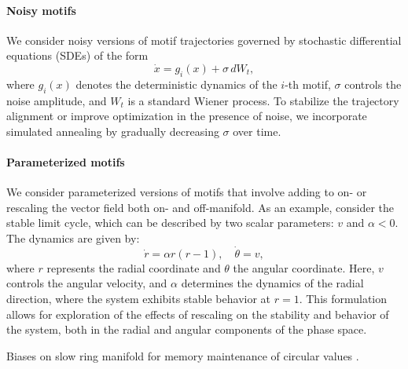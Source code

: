 \documentclass{article}
\theoremstyle{definition} \newtheorem{definition}{Definition}  \newtheorem{example}{Example}
\theoremstyle{remark} \newtheorem{remark}{Remark}
\newcounter{ct}
\begin{document}
\paragraph{Noisy motifs}
We consider noisy versions of motif trajectories governed by stochastic differential equations (SDEs) of the form
\begin{equation}
\dot x = g_i(x) + \sigma \, dW_t,
\end{equation}
where \( g_i(x) \) denotes the deterministic dynamics of the \( i \)-th motif, \( \sigma \) controls the noise amplitude, and \( W_t \) is a standard Wiener process.
To stabilize the trajectory alignment or improve optimization in the presence of noise, we incorporate simulated annealing by gradually decreasing \( \sigma \) over time.


\paragraph{Parameterized motifs}
We consider parameterized versions of motifs that involve adding to on- or rescaling the vector field both on- and off-manifold.
As an example, consider the stable limit cycle, which can be described by two scalar parameters: \( v \) and \( \alpha < 0 \).
The dynamics are given by:
\begin{equation}
\dot{r} = \alpha r (r - 1), %
\quad \dot{\theta} = v,
\end{equation}
where \( r \) represents the radial coordinate and \( \theta \) the angular coordinate. Here, \( v \) controls the angular velocity, and \( \alpha \) determines the dynamics of the radial direction, where the system exhibits stable behavior at \( r = 1 \). This formulation allows for exploration of the effects of rescaling on the stability and behavior of the system, both in the radial and angular components of the phase space.


Biases on slow ring manifold for memory maintenance of circular values \citep{panichello2019error}.

\end{document}
